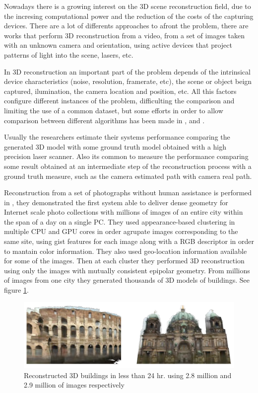 
Nowadays there is a growing interest on the 3D scene reconstruction field, due to the incresing computational power and the reduction of 
the costs of the capturing devices. There are a lot of differents approaches to afront the problem, there are works that perform 3D reconstruction 
from a video, from a set of images taken with an unknown camera and orientation, using active devices that project patterns of light into 
the scene, lasers, etc. 

In 3D reconstruction an important part of the problem depends of the intrinsical 
device characteristics (noise, resolution, framerate, etc), the scene or object beign captured, ilumination, the camera location and position, etc. All this factors configure different instances of the problem, difficulting the comparison and limiting the use of a common dataset, but some efforts in order to allow comparison between different algorithms has been made 
in \cite{seitz2006}, \cite{ponce2006} and \cite{scharstein2001}.

Usually the researchers estimate their systems performance comparing the generated 3D model with some 
ground truth model obtained with a high precision laser scanner. Also its common to measure the performance
 comparing some result obtained at an intermediate step of the reconstruction process with a ground truth measure, 
such as the camera estimated path with camera real path.   

Reconstruction from a set of photographs without human assistance is performed in \cite{jan}, they demonstrated the first system able to deliver dense geometry for Internet scale photo collections with millions of images of an entire city within the span of a day on a single PC. They used appearance-based clustering in multiple CPU and GPU cores 
in order agrupate images corresponding to the same site, using gist features for each image along with a RGB
descriptor in order to mantain color information. They also used geo-location information available for some of 
the images. Then at each cluster they performed 3D reconstruction using only the images with mutually consistent epipolar 
geometry. From millions of images from one city they generated thousands of 3D models of buildings. See figure \ref{fig:jan}. 


\begin{figure}[h!]
\begin{center}
\includegraphics[scale=0.25]{images/jan}
\caption{Reconstructed 3D buildings in less than 24 hr. using 2.8 million and 2.9 million of images respectively}
\label{fig:jan}
\end{center}
\end{figure}

